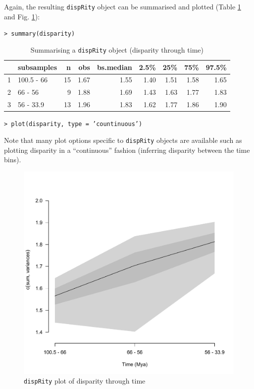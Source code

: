 \documentclass[12pt,letterpaper]{article}
\newcommand{\disp}{\texttt{dispRity} }
\begin{document}
Again, the resulting \disp object can be summarised and plotted (Table \ref{Tab:summary_time} and Fig. \ref{Fig:plot_time}):

\texttt{> summary(disparity)}

\begin{table}[ht]
\centering
\begin{tabular}{rlrrrrrrr}
  \hline
 & subsamples & n & obs & bs.median & 2.5\% & 25\% & 75\% & 97.5\% \\ 
  \hline
1 & 100.5 - 66 &  15 & 1.67 & 1.55 & 1.40 & 1.51 & 1.58 & 1.65 \\ 
  2 & 66 - 56 &   9 & 1.88 & 1.69 & 1.43 & 1.63 & 1.77 & 1.83 \\ 
  3 & 56 - 33.9 &  13 & 1.96 & 1.83 & 1.62 & 1.77 & 1.86 & 1.90 \\ 
   \hline
\end{tabular}
\caption{Summarising a \disp object (disparity through time)}
\label{Tab:summary_time}
\end{table}

\texttt{> plot(disparity, type = 'countinuous')}

\noindent Note that many plot options specific to \disp objects are available such as plotting disparity in a ``continuous'' fashion (inferring disparity between the time bins).

\begin{figure}[!htbp]
\centering
   \includegraphics[width=1\textwidth]{plot_example_time.pdf} 
\caption{\disp plot of disparity through time}
\label{Fig:plot_time}
\end{figure}
\end{document}
